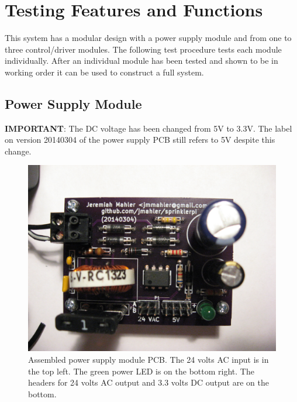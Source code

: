 \documentclass{article}
\begin{document}

\section{Testing Features and Functions}

This system has a modular design with a power supply module and from
one to three control/driver modules.
The following test procedure tests each module individually.
After an individual module has been tested and shown to be in working
order it can be used to construct a full system.

\subsection{Power Supply Module}

\begin{framed}
\textbf{IMPORTANT}: The DC voltage has been changed
from 5V to 3.3V.
The label on version 20140304 of the power supply PCB still
refers to 5V despite this change.
\end{framed}

\begin{figure}[hbp!]
\begin{center}
\includegraphics[scale=0.15,angle=0]{img/power_pcb-assembled-02.jpg}
\end{center}
\caption{Assembled power supply module PCB.
The 24 volts AC input is in the top left.
The green power LED is on the bottom right.
The headers for 24 volts AC output and 3.3 volts DC
output are on the bottom.
}\label{fig:psm2}
\end{figure}
\end{document}
